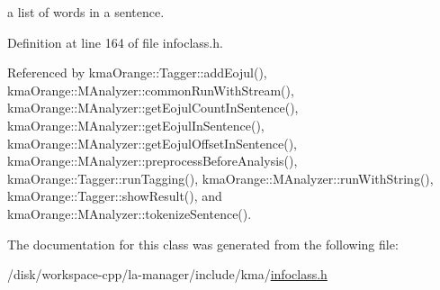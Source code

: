 a list of words in a sentence. 



Definition at line 164 of file infoclass.h.

Referenced by kmaOrange::Tagger::addEojul(), kmaOrange::MAnalyzer::commonRunWithStream(), kmaOrange::MAnalyzer::getEojulCountInSentence(), kmaOrange::MAnalyzer::getEojulInSentence(), kmaOrange::MAnalyzer::getEojulOffsetInSentence(), kmaOrange::MAnalyzer::preprocessBeforeAnalysis(), kmaOrange::Tagger::runTagging(), kmaOrange::MAnalyzer::runWithString(), kmaOrange::Tagger::showResult(), and kmaOrange::MAnalyzer::tokenizeSentence().

The documentation for this class was generated from the following file:\begin{CompactItemize}
\item 
/disk/workspace-cpp/la-manager/include/kma/\hyperlink{infoclass_8h}{infoclass.h}\end{CompactItemize}
